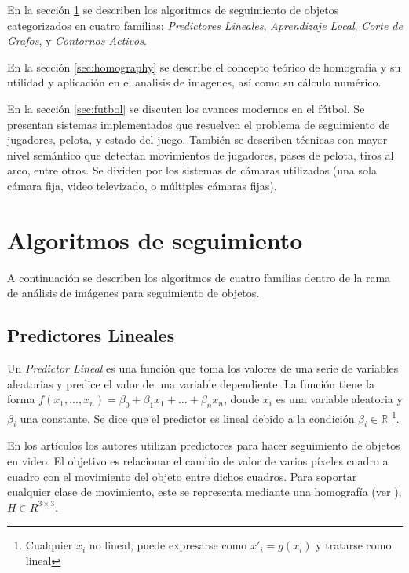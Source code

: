 \documentclass[a4paper,10pt]{article}
\begin{document}
En la sección \ref{sec:tracking} se describen los algoritmos de seguimiento
de objetos categorizados en cuatro familias:
\textit{Predictores Lineales},
\textit{Aprendizaje Local},
\textit{Corte de Grafos},
y \textit{Contornos Activos}.

En la sección \ref{sec:homography} se describe el concepto teórico de homografía y
su utilidad y aplicación en el analisis de imagenes, así como su cálculo numérico.

En la sección \ref{sec:futbol} se discuten los avances modernos en el fútbol.
Se presentan sistemas implementados que resuelven el problema de seguimiento de
jugadores, pelota, y estado del juego. También se describen técnicas con
mayor nivel semántico que detectan movimientos de jugadores, pases de pelota,
tiros al arco, entre otros. Se dividen por los
sistemas de cámaras utilizados (una sola cámara fija, video televizado, o
múltiples cámaras fijas).

\newpage

\section{Algoritmos de seguimiento}
\label{sec:tracking}

A continuación se describen los algoritmos de cuatro familias dentro de la rama
de análisis de imágenes para seguimiento de objetos.

\subsection{Predictores Lineales}

Un \textit{Predictor Lineal} es una función que toma los valores de una serie
de variables aleatorias y predice el valor de una variable dependiente.  La
función tiene la forma $f(x_1, ..., x_n) = \beta_0 + \beta_1 x_1 + \dots +
\beta_n x_n$, donde $x_i$ es una variable aleatoria y $\beta_i$ una constante.
Se dice que el predictor es lineal debido a la condición $\beta_i \in \mathbb{R}$
\footnote{Cualquier $x_i$ no lineal, puede expresarse como $x'_i = g(x_i)$ y tratarse como lineal}.

En los artículos \cite{alp, original-linear-predictors} los autores utilizan
predictores para hacer seguimiento de objetos en video.  El objetivo es
relacionar el cambio de valor de varios píxeles cuadro a cuadro con el
movimiento del objeto entre dichos cuadros.  Para soportar cualquier clase de
movimiento, este se representa mediante una homografía (ver
\cite{homography-estimation}), $H \in R^{3\times3}$.
\end{document}
